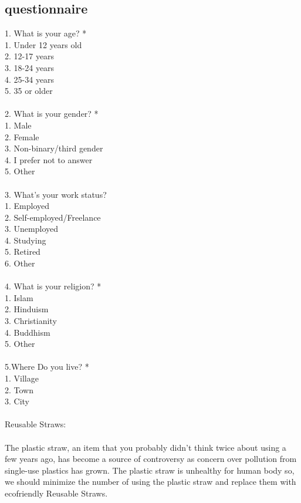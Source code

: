 \documentclass[conference]{IEEEtran}
\begin{document}
\subsection{questionnaire}
1. What is your age? *\\ 
1. Under 12 years old\\ 
2. 12-17 years\\ 
3. 18-24 years\\ 
4. 25-34 years\\ 
5. 35 or older\\ \\ 
2. What is your gender? *\\ 
1. Male\\ 
2. Female\\ 
3. Non-binary/third gender\\ 
4. I prefer not to answer\\ 
5. Other\\ \\ 
3. What’s your work status?\\ 
1. Employed\\ 
2. Self-employed/Freelance\\ 
3. Unemployed\\ 
4. Studying\\ 
5. Retired\\ 
6. Other\\ \\ 
4. What is your religion? *\\ 
1. Islam\\ 
2. Hinduism\\ 
3. Christianity\\ 
4. Buddhism\\ 
5. Other\\ \\ 
5.Where Do you live? *\\ 
1.	Village\\ 
2.	Town\\ 
3.	City\\ \\ 
Reusable Straws:\\\\  
The plastic straw, an item that you probably didn’t think twice about using a few years ago, has become a source of controversy as concern over pollution from single-use plastics has grown. The plastic straw is unhealthy for human body so, we should minimize the number of using the plastic straw and replace them with ecofriendly Reusable Straws. \\ 
\end{document}
